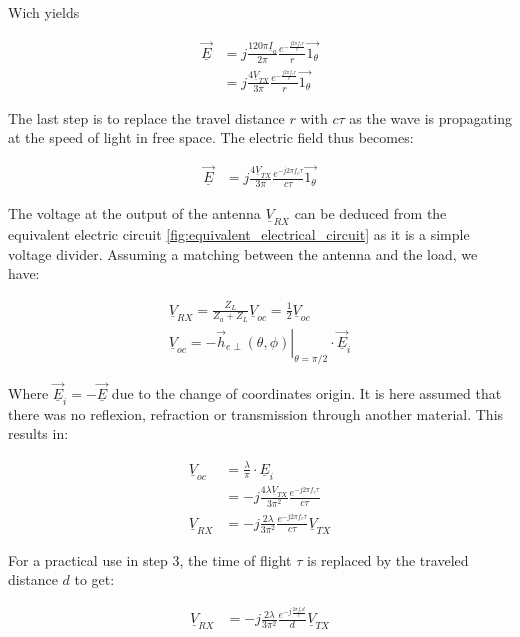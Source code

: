 \documentclass[10pt,a4paper]{ULBreport}
\begin{document}
Wich yields

\begin{align*}
    \underline{\vec{E}} &= j \frac{120\pi\underline{I}_a}{2\pi} \frac{e^{-\frac{j2\pi f_c r}{c}}}{r} \vec{1_{\theta}}\\
    &= j \frac{4\underline{V}_{TX}}{3\pi} \frac{e^{-\frac{j2\pi f_c r}{c}}}{r} \vec{1_{\theta}}
\end{align*}

The last step is to replace the travel distance $r$ with $c \tau$ as the wave is propagating at the speed of light in free space. The electric field thus becomes:

\begin{align*}
    \underline{\vec{E}} &= j \frac{4 \underline{V}_{TX}}{3\pi} \frac{e^{-j2\pi f_c \tau}}{c\tau} \vec{1_{\theta}}
\end{align*}

The voltage at the output of the antenna $\underline{V}_{RX}$ can be deduced from the equivalent electric circuit \ref{fig:equivalent_electrical_circuit} as it is a simple voltage divider. Assuming a matching between the antenna and the load, we have:

\begin{align*}
    \underline{V}_{RX} = \frac{Z_L}{Z_a + Z_L} \underline{V}_{oc} = \frac{1}{2} \underline{V}_{oc}\\
    \underline{V}_{oc} = -\left . \vec{h}_{e\perp}(\theta, \phi)\right\vert_{\theta = \pi/2} \cdot \underline{\vec{E}}_i
\end{align*}

Where $\underline{\vec{E}}_i = - \underline{\vec{E}}$ due to the change of coordinates origin. It is here assumed that there was no reflexion, refraction or transmission through another material. This results in:

\begin{align*}
    \underline{V}_{oc} &= \frac{\lambda}{\pi} \cdot \underline{E}_i\\
    &= -j\frac{4  \lambda \underline{V}_{TX}}{3\pi^2}\frac{e^{-j 2\pi f_c \tau}}{c\tau}\\
    \underline{V}_{RX} &= -j\frac{2  \lambda }{3\pi^2}\frac{e^{-j 2\pi f_c \tau}}{c\tau}\underline{V}_{TX}
\end{align*}

For a practical use in step 3, the time of flight $\tau$ is replaced by the traveled distance $d$ to get:

\begin{align*}
    \underline{V}_{RX} &= -j\frac{2 \lambda }{3\pi^2}\frac{e^{-j\frac{2\pi f_c d}{c}}}{d}\underline{V}_{TX}
\end{align*}
\end{document}

